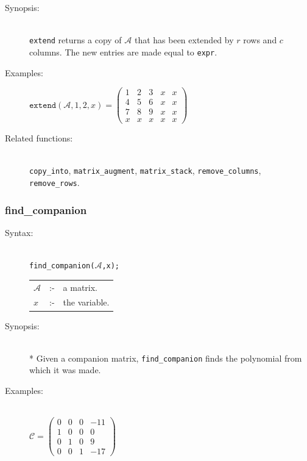 {\begin{description}
\item[Synopsis:]\mbox{}\\
                \texttt{extend} returns a copy of $\mathcal{A}$ that has been
                extended by $r$ rows and $c$ columns. The new entries are
                made equal to \texttt{expr}.

\item[Examples:]
\begin{flushleft}
\(
\texttt{extend}(\mathcal{A},1,2,x) =
\begin{pmatrix} 1 & 2 & 3 & x & x \\ 4 & 5 & 6 & x & x
\\ 7 & 8 & 9 & x & x \\ x & x & x & x & x
\end{pmatrix}
\)
\end{flushleft}

\item[Related functions:]\mbox{}\\
\texttt{copy\_into}, \texttt{matrix\_augment},
\texttt{matrix\_stack}, \texttt{remove\_columns}, \texttt{remove\_rows}.

\end{description}


\subsubsection{find\_companion}
\label{linalg:find_companion}
\hypertarget{operator:FIND_COMPANION}{}

\begin{description}
\item[Syntax:]\mbox{}\\
{\tt find\_companion($\mathcal{A}$,x);}\\[2mm]
\begin{tabular}{l l l}
$\mathcal{A}$ &:-& a matrix. \\
$x$          &:-& the variable.
\end{tabular}

\item[Synopsis:]\mbox{}\\*
  Given a companion matrix, \texttt{find\_companion} finds the polynomial
from which it was made.

\item[Examples:]\mbox{}\\
  \(\mathcal{C} = \begin{pmatrix} 0 & 0 & 0 & -11 \\ 1 & 0 & 0 & 0
    \\ 0 & 1 & 0 & 9 \\ 0 & 0 & 1 & -17 \end{pmatrix}\)


\end{description}}
